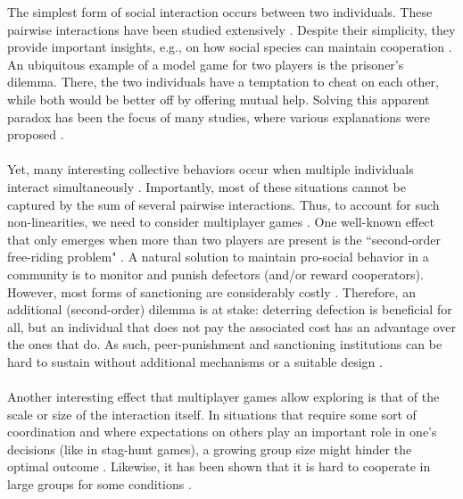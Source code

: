 \documentclass[11pt]{article}
\theoremstyle{plainCl1}
\theoremstyle{plainCl2}
\begin{document}
The simplest form of social interaction occurs between two individuals. These pairwise interactions have been studied extensively \cite{Hofbauer:book:1998}. Despite their simplicity, they provide important insights, e.g., on how social species can maintain cooperation \cite{Axelrod:book:1984, Nowak:book:2011}. An ubiquitous example of a model game for two players is the prisoner's dilemma. There, the two individuals have a temptation to cheat on each other, while both would be better off by offering mutual help. Solving this apparent paradox has been the focus of many studies, where various explanations were proposed \cite{Nowak:Science:2006}. 
\\ \\
\noindent Yet, many interesting collective behaviors occur when multiple individuals interact simultaneously \cite{Palm:JMB:1984, Skyrms:book:2003, Pacheco:PRSB:2009, Archetti:EL:2011, Archetti:JTB:2012, Gokhale:DGAA:2014, Hilbe:JTB:2015, Venkateswaran:PRSB:2019}.
Importantly, most of these situations cannot be captured by the sum of several pairwise interactions. Thus, to account for such non-linearities, we need to consider multiplayer games \cite{Gokhale:DGAA:2014}. One well-known effect that only emerges when more than two players are present is the ``second-order free-riding problem" \cite{Fowler:PNAS:2005}. A natural solution to maintain pro-social behavior in a community is to monitor and punish defectors (and/or reward cooperators). However, most forms of sanctioning are considerably costly \cite{Henrich:Science:2006}. Therefore, an additional (second-order) dilemma is at stake: deterring defection is beneficial for all, but an individual that does not pay the associated cost has an advantage over the ones that do. As such, peer-punishment and sanctioning institutions can be hard to sustain without additional mechanisms or a suitable design \cite{Panchanathan:Nature:2004, Perc:SciRep:2012, Hilbe:SciRep:2012, Couto:JTB:2020, Pal:NatCom:2022}.
\\ \\
\noindent 
Another interesting effect that multiplayer games allow exploring is that of the scale or size of the interaction itself. In situations that require some sort of coordination and where expectations on others play an important role in one's decisions (like in stag-hunt games), a growing group size might hinder the optimal outcome \cite{Skyrms:book:2003}. Likewise, it has been shown that it is hard to cooperate in large groups for some conditions \cite{Santos:PNAS:2011, Hilbe:JTB:2015}.
\end{document}
